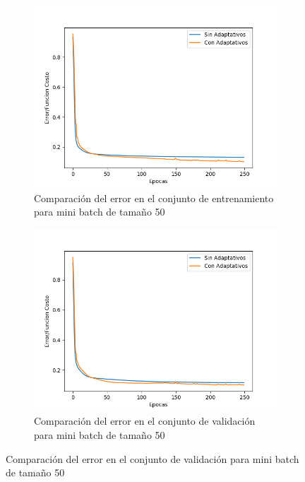 \begin{figure}[!htbp]
\centering
\begin{subfigure}{.5\textwidth}
  \centering
  \includegraphics[width=1\linewidth]{graficos/ej2/adaptativos_promedios_entrenamiento_50.png}
  \caption{Comparación del error en el conjunto de entrenamiento para mini batch de tamaño 50}
  \label{fig:sub1}
\end{subfigure}%
\begin{subfigure}{.5\textwidth}
  \centering
  \includegraphics[width=1\linewidth]{graficos/ej2/adaptativos_promedios_validacion_50.png}
  \caption{Comparación del error en el conjunto de validación para mini batch de tamaño 50}
  \label{fig:sub2}
\end{subfigure}
\end{figure}

